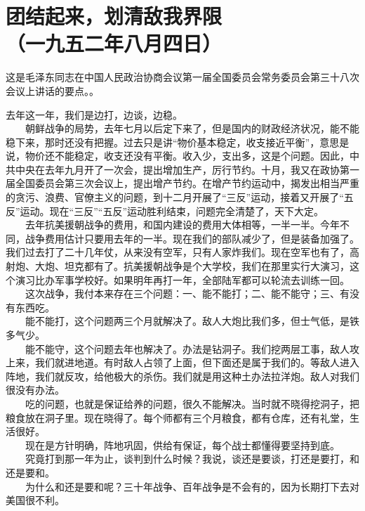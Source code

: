 \documentclass[cn,11pt,chinese]{elegantbook}
\def\myformat#1{\hfil\hfil #1}
\begin{document}
\section*{\myformat{团结起来，划清敌我界限}\\\myformat{（一九五二年八月四日）}}
\begin{introduction}\item  这是毛泽东同志在中国人民政治协商会议第一届全国委员会常务委员会第三十八次会议上讲话的要点。。\end{introduction}
去年这一年，我们是边打，边谈，边稳。\\
　　朝鲜战争的局势，去年七月以后定下来了，但是国内的财政经济状况，能不能稳下来，那时还没有把握。过去只是讲“物价基本稳定，收支接近平衡”，意思是说，物价还不能稳定，收支还没有平衡。收入少，支出多，这是个问题。因此，中共中央在去年九月开了一次会，提出增加生产，厉行节约。十月，我又在政协第一届全国委员会第三次会议上，提出增产节约。在增产节约运动中，揭发出相当严重的贪污、浪费、官僚主义的问题，到十二月开展了“三反”运动，接着又开展了“五反”运动。现在“三反”“五反”运动胜利结束，问题完全清楚了，天下大定。\\
　　去年抗美援朝战争的费用，和国内建设的费用大体相等，一半一半。今年不同，战争费用估计只要用去年的一半。现在我们的部队减少了，但是装备加强了。我们过去打了二十几年仗，从来没有空军，只有人家炸我们。现在空军也有了，高射炮、大炮、坦克都有了。抗美援朝战争是个大学校，我们在那里实行大演习，这个演习比办军事学校好。如果明年再打一年，全部陆军都可以轮流去训练一回。\\
　　这次战争，我付本来存在三个问题：一、能不能打；二、能不能守；三、有没有东西吃。\\
　　能不能打，这个问题两三个月就解决了。敌人大炮比我们多，但士气低，是铁多气少。\\
　　能不能守，这个问题去年也解决了。办法是钻洞子。我们挖两层工事，敌人攻上来，我们就进地道。有时敌人占领了上面，但下面还是属于我们的。等敌人进入阵地，我们就反攻，给他极大的杀伤。我们就是用这种土办法拉洋炮。敌人对我们很没有办法。\\
　　吃的问题，也就是保证给养的问题，很久不能解决。当时就不晓得挖洞子，把粮食放在洞子里。现在晓得了。每个师都有三个月粮食，都有仓库，还有礼堂，生活很好。\\
　　现在是方针明确，阵地巩固，供给有保证，每个战士都懂得要坚持到底。\\
　　究竟打到那一年为止，谈判到什么时候？我说，谈还是要谈，打还是要打，和还是要和。\\
　　为什么和还是要和呢？三十年战争、百年战争是不会有的，因为长期打下去对美国很不利。\\
\end{document}
